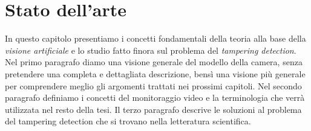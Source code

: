\chapter{Stato dell'arte}
\label{StatoArte}
\thispagestyle{empty}

\vspace{0.5cm}

\noindent In questo capitolo presentiamo i concetti fondamentali della teoria alla base della \textit{visione artificiale} e lo studio fatto finora sul problema del \textit{tampering detection}.
Nel primo paragrafo diamo una visione generale del modello della camera, senza pretendere una completa e dettagliata descrizione, bens\`i una visione pi\`u generale per comprendere meglio gli argomenti trattati nei prossimi capitoli.
Nel secondo paragrafo definiamo i concetti del monitoraggio video e la terminologia che verr\`a utilizzata nel resto della tesi.
Il terzo paragrafo descrive le soluzioni al problema del tampering detection che si trovano nella letteratura scientifica.
